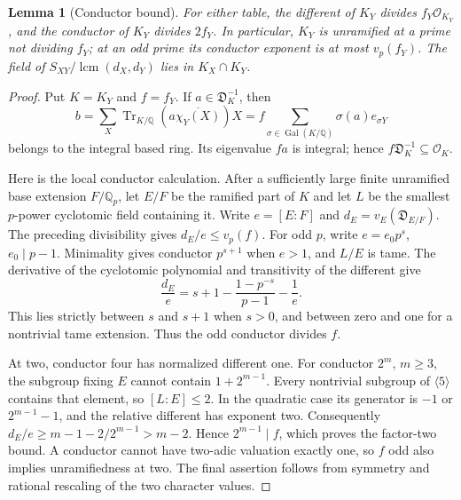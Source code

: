 \documentclass[11pt,a4paper]{article}
\numberwithin{equation}{section}
\newtheorem{lemma}[theorem]{Lemma}
\begin{document}
\begin{lemma}[Conductor bound]\label{arith:conductor}
For either table, the different of $K_Y$ divides $f_Y\mathcal O_{K_Y}$,
and the conductor of $K_Y$ divides $2f_Y$.
In particular, $K_Y$ is unramified at a prime not dividing $f_Y$;
at an odd prime its conductor exponent is at most $v_p(f_Y)$.
The field of $S_{XY}/\operatorname{lcm}(d_X,d_Y)$ lies in
$K_X\cap K_Y$.
\end{lemma}
\begin{proof}
Put $K=K_Y$ and $f=f_Y$. If $a\in\mathfrak D_K^{-1}$, then
\[
 b=\sum_X\operatorname{Tr}_{K/\mathbb Q}
                   (a\overline{\chi_Y(X)})X
   =f\sum_{\sigma\in\operatorname{Gal}(K/\mathbb Q)}
                   \sigma(a)e_{\sigma Y}
\]
belongs to the integral based ring. Its eigenvalue $fa$ is integral;
hence $f\mathfrak D_K^{-1}\subseteq\mathcal O_K$.

Here is the local conductor calculation. After a sufficiently large
finite unramified base extension $F/\mathbb Q_p$, let $E/F$ be the
ramified part of $K$ and let $L$ be the
smallest $p$-power cyclotomic field containing it. Write
$e=[E:F]$ and $d_E=v_E(\mathfrak D_{E/F})$. The preceding divisibility
gives $d_E/e\le v_p(f)$. For odd $p$, write $e=e_0p^s$,
$e_0\mid p-1$. Minimality gives conductor $p^{s+1}$ when $e>1$,
and $L/E$ is tame. The derivative of the cyclotomic polynomial and
transitivity of the different give
\begin{equation}\label{arith:local-different}
 \frac{d_E}{e}
 =s+1-\frac{1-p^{-s}}{p-1}-\frac1e.
\end{equation}
This lies strictly between $s$ and $s+1$ when $s>0$, and between
zero and one for a nontrivial tame extension. Thus the odd
conductor divides $f$.

At two, conductor four has normalized different one. For conductor
$2^m$, $m\ge3$, the subgroup fixing $E$ cannot contain
$1+2^{m-1}$. Every nontrivial subgroup of $\langle5\rangle$
contains that element, so $[L:E]\le2$. In the quadratic case its
generator is $-1$ or $2^{m-1}-1$, and the relative different
has exponent two. Consequently
$d_E/e\ge m-1-2/2^{m-1}>m-2$. Hence $2^{m-1}\mid f$,
which proves the factor-two bound. A conductor cannot have
two-adic valuation exactly one, so $f$ odd also implies
unramifiedness at two. The final assertion follows from symmetry
and rational rescaling of the two character values.
\end{proof}
\end{document}

